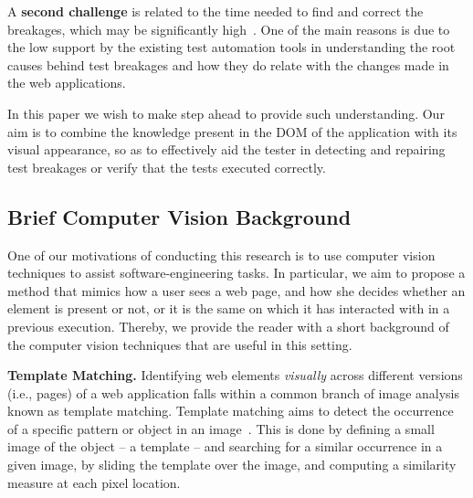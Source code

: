 A \textbf{second challenge} is related to the time needed to find and correct the breakages, which may be significantly high~\cite{Leotta-TAIC-2013,JAMAICA2013}. One of the main reasons is due to the low support by the existing test automation tools in understanding the root causes behind test breakages and how they do relate with the changes made in the web applications. 

In this paper we wish to make step ahead to provide such understanding. 
Our aim is to combine the knowledge present in the DOM of the application with its visual appearance, so as to effectively aid the tester in detecting and repairing test breakages or verify that the tests executed correctly. %


\subsection{Brief Computer Vision Background}\label{sec:cv}

One of our motivations of conducting this research is to use computer vision techniques to assist software-engineering tasks. In particular, we aim to propose a method that mimics how a user sees a web page, and how she decides whether an element is present or not, or it is the same on which it has interacted with in a previous execution. Thereby, we provide the reader with a short background of the computer vision techniques that are useful in this setting.

\noindent
\textbf{Template Matching.}\label{sec:tm}
Identifying web elements \textit{visually} across different versions (i.e., pages) of a web application falls within a common branch of image analysis known as template matching. 
%
Template matching aims to detect the occurrence of a specific pattern or object in an image~\cite{Brunelli:2009:TMT:1643435}. This is done by defining a small image of the object -- a template -- and searching for a similar occurrence in a given image, by sliding the template over the image, and computing a similarity measure at each pixel location.

